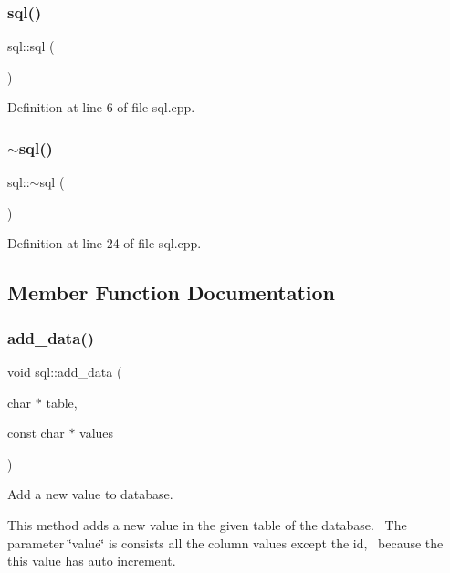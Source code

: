 \subsubsection{\texorpdfstring{sql()}{sql()}}
{\footnotesize\ttfamily sql\+::sql (\begin{DoxyParamCaption}{ }\end{DoxyParamCaption})}



Definition at line 6 of file sql.\+cpp.

\mbox{\label{classsql_a67805540e55f3cfb1849178023aa39b2}} 
\subsubsection{\texorpdfstring{$\sim$sql()}{~sql()}}
{\footnotesize\ttfamily sql\+::$\sim$sql (\begin{DoxyParamCaption}{ }\end{DoxyParamCaption})}



Definition at line 24 of file sql.\+cpp.



\subsection{Member Function Documentation}
\mbox{\label{classsql_a94c4df2d61461e99d3767f1b37163c2f}} 
\subsubsection{\texorpdfstring{add\+\_\+data()}{add\_data()}}
{\footnotesize\ttfamily void sql\+::add\+\_\+data (\begin{DoxyParamCaption}\item[{char $\ast$}]{table,  }\item[{const char $\ast$}]{values }\end{DoxyParamCaption})}



Add a new value to database. 

This method adds a new value in the given table of the database.~\newline
The parameter \char`\"{}value\char`\"{} is consists all the column values except the id,~\newline
because the this value has auto increment.

